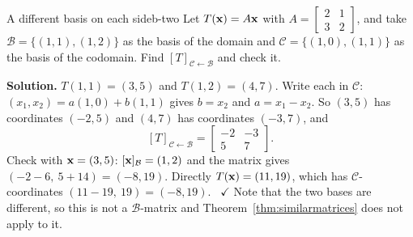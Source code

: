 \documentclass[11pt]{article}
\begin{document}
\begin{exmp}{A different basis on each side}{b-two}
Let $T(\mathbf{x})=A\mathbf{x}$ with $A=\begin{bmatrix}2&1\\3&2\end{bmatrix}$, and take $\mathcal{B}=\{(1,1),(1,2)\}$ as the basis of the domain and $\mathcal{C}=\{(1,0),(1,1)\}$ as the basis of the codomain. Find $[T]_{\mathcal{C}\leftarrow\mathcal{B}}$ and check it.

\textbf{Solution.} $T(1,1)=(3,5)$ and $T(1,2)=(4,7)$. Write each in $\mathcal{C}$: $(x_1,x_2)=a(1,0)+b(1,1)$ gives $b=x_2$ and $a=x_1-x_2$. So $(3,5)$ has coordinates $(-2,5)$ and $(4,7)$ has coordinates $(-3,7)$, and
\[
[T]_{\mathcal{C}\leftarrow\mathcal{B}}=\begin{bmatrix}-2&-3\\5&7\end{bmatrix}.
\]
Check with $\mathbf{x}=(3,5)$: $[\mathbf{x}]_{\mathcal{B}}=(1,2)$ and the matrix gives $(-2-6,\ 5+14)=(-8,19)$. Directly $T(\mathbf{x})=(11,19)$, which has $\mathcal{C}$-coordinates $(11-19,\ 19)=(-8,19)$. \ $\checkmark$ Note that the two bases are different, so this is not a $\mathcal{B}$-matrix and Theorem~\ref{thm:similarmatrices} does not apply to it.
\end{exmp}
\end{document}
